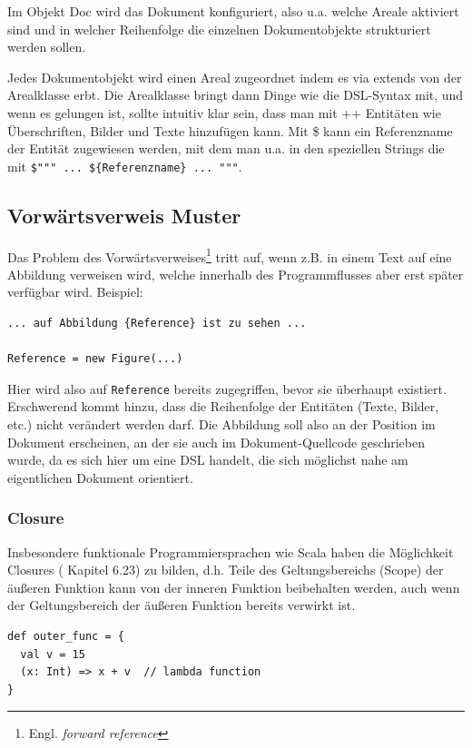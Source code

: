 Im Objekt Doc wird das Dokument konfiguriert, also u.a. welche Areale aktiviert
sind und in welcher Reihenfolge die einzelnen Dokumentobjekte strukturiert
werden sollen.

Jedes Dokumentobjekt wird einen Areal zugeordnet indem es via extends
von der Arealklasse erbt. Die Arealklasse bringt dann Dinge wie die DSL-Syntax
mit, und wenn es gelungen ist, sollte intuitiv klar sein, dass man mit
++ Entitäten wie Überschriften, Bilder und Texte hinzufügen kann. Mit \$
kann ein Referenzname der Entität zugewiesen werden, mit dem man u.a. in
den speziellen Strings die mit \lstinline|$""" ... ${Referenzname} ... """|.


\subsection{Vorwärtsverweis Muster}\label{sec-forwardreference}

Das Problem des
Vorwärtsverweises\footnote{Engl. \emph{forward reference}} tritt auf,
wenn z.B. in einem Text auf eine Abbildung
verweisen wird, welche innerhalb des Programmflusses aber erst später verfügbar
wird. Beispiel:

\begin{lstlisting}
... auf Abbildung {Reference} ist zu sehen ...

Reference = new Figure(...)
\end{lstlisting}

Hier wird also auf \lstinline|Reference| bereits zugegriffen,
bevor sie überhaupt existiert. Erschwerend kommt hinzu, dass die
Reihenfolge der Entitäten (Texte, Bilder, etc.) nicht verändert werden darf.
Die Abbildung soll also an der Position im Dokument erscheinen, an der sie
auch im Dokument-Quellcode geschrieben wurde, da es sich hier um eine DSL
handelt, die sich möglichst nahe am eigentlichen Dokument orientiert.

\subsubsection{Closure}\label{sec-closure}

Insbesondere funktionale Programmiersprachen wie Scala haben die
Möglichkeit Closures (\cite{scala-ref} Kapitel 6.23) zu bilden,
d.h. Teile des Geltungsbereichs (Scope)
der äußeren Funktion kann von der inneren Funktion beibehalten werden,
auch wenn der Geltungsbereich der äußeren Funktion bereits verwirkt ist.

\begin{lstlisting}
def outer_func = {
  val v = 15
  (x: Int) => x + v  // lambda function
}
\end{lstlisting}

